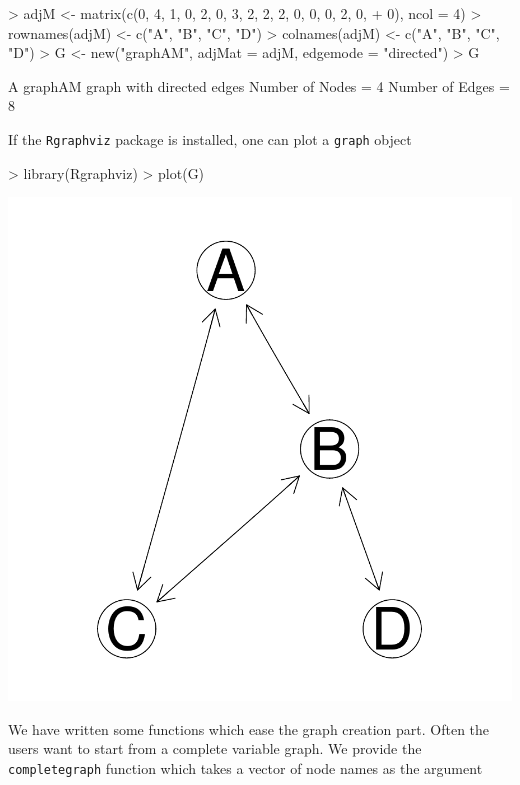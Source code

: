 \documentclass[12pt,oneside,titlepage,letter]{article}
\begin{document}
\begin{Schunk}
\begin{Sinput}
> adjM <- matrix(c(0, 4, 1, 0, 2, 0, 3, 2, 2, 2, 0, 0, 0, 2, 0, 
+     0), ncol = 4)
> rownames(adjM) <- c("A", "B", "C", "D")
> colnames(adjM) <- c("A", "B", "C", "D")
> G <- new("graphAM", adjMat = adjM, edgemode = "directed")
> G
\end{Sinput}
\begin{Soutput}
A graphAM graph with directed edges
Number of Nodes = 4 
Number of Edges = 8 
\end{Soutput}
\end{Schunk}
If the \texttt{Rgraphviz} package is installed, one can plot a \texttt{graph} object 
\begin{center}
\begin{Schunk}
\begin{Sinput}
> library(Rgraphviz)
> plot(G)
\end{Sinput}
\end{Schunk}
\includegraphics{sweave_p-031}
\end{center}

We have written some functions which ease the graph creation part. Often the users want to start from a complete variable graph. We provide the \texttt{completegraph} function which takes a vector of node names as the argument
\end{document}
